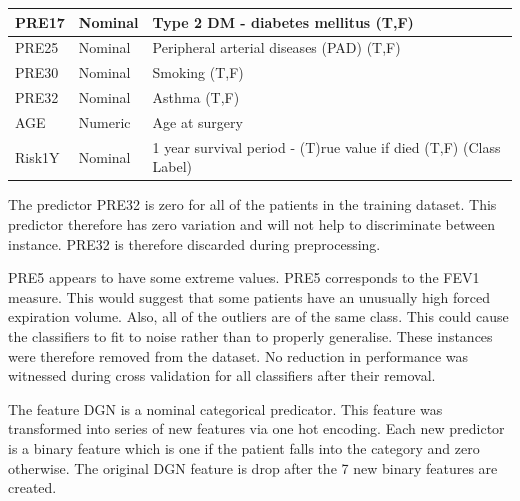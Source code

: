 \documentclass[journal]{IEEEtran}
\begin{document}
\begin{table}[]
\begin{tabular}{|l|l|p{6cm}|}
PRE17           & Nominal       & Type 2 DM - diabetes mellitus (T,F)                                                                                                            \\ \hline
PRE25           & Nominal       & Peripheral arterial diseases (PAD) (T,F)                                                                                                       \\ \hline
PRE30           & Nominal       & Smoking (T,F)                                                                                                                                  \\ \hline
PRE32           & Nominal       & Asthma (T,F)                                                                                                                                   \\ \hline
AGE             & Numeric       & Age at surgery                                                                                                                                 \\ \hline
Risk1Y          & Nominal       & 1 year survival period - (T)rue value if died (T,F) (Class Label)                                                                              \\ \hline
\end{tabular}
\end{table}

The predictor PRE32 is zero for all of the patients in the training dataset. This predictor therefore has zero variation and will not help to discriminate between instance. PRE32 is therefore discarded during preprocessing. 

PRE5 appears to have some extreme values. PRE5 corresponds to the FEV1 measure. This would suggest that some patients have an unusually high forced expiration volume. Also, all of the outliers are of the same class. This could cause the classifiers to fit to noise rather than to properly generalise. These instances were therefore removed from the dataset. No reduction in performance was witnessed during cross validation for all classifiers after their removal.

The feature DGN is a nominal categorical predicator. This feature was transformed into series of new features via one hot encoding. Each new predictor is a binary feature which is one if the patient falls into the category and zero otherwise. The original DGN feature is drop after the 7 new binary features are created.
\end{document}
